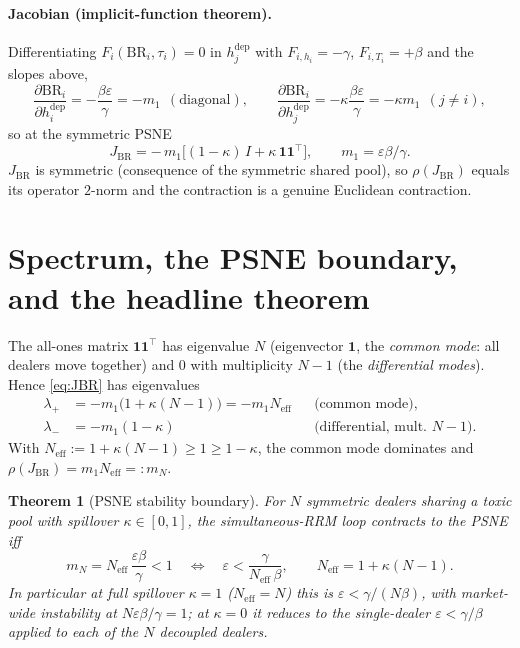 \documentclass[11pt]{article}
\newtheorem{theorem}{Theorem}
\newcommand{\eps}{\varepsilon}
\newcommand{\BR}{\mathrm{BR}}
\newcommand{\Neff}{N_{\mathrm{eff}}}
\newcommand{\ones}{\bm{1}}
\begin{document}
\paragraph{Jacobian (implicit-function theorem).}
Differentiating $F_i(\BR_i,\tau_i)=0$ in $h_j^{\mathrm{dep}}$ with $F_{i,h_i}=-\gamma$,
$F_{i,T_i}=+\beta$ and the slopes above,
%
\begin{equation}
  \frac{\partial \BR_i}{\partial h_i^{\mathrm{dep}}} = -\frac{\beta\eps}{\gamma}=-m_1
  \ \ (\text{diagonal}),\qquad
  \frac{\partial \BR_i}{\partial h_j^{\mathrm{dep}}} = -\kappa\frac{\beta\eps}{\gamma}=-\kappa m_1
  \ \ (j\ne i),
\end{equation}
%
so at the symmetric PSNE
%
\begin{equation}
  J_{\BR} = -\,m_1\big[(1-\kappa)\,I + \kappa\,\ones\ones^{\!\top}\big],
  \qquad m_1=\eps\beta/\gamma.
  \label{eq:JBR}
\end{equation}
%
$J_{\BR}$ is symmetric (consequence of the symmetric shared pool), so $\rho(J_{\BR})$
equals its operator $2$-norm and the contraction is a genuine Euclidean contraction.

\section{Spectrum, the PSNE boundary, and the headline theorem}

The all-ones matrix $\ones\ones^{\!\top}$ has eigenvalue $N$ (eigenvector $\ones$,
the \emph{common mode}: all dealers move together) and $0$ with multiplicity $N-1$
(the \emph{differential modes}). Hence \eqref{eq:JBR} has eigenvalues
%
\begin{align*}
  \lambda_+ &= -m_1\big(1+\kappa(N-1)\big) = -m_1\Neff && \text{(common mode)},\\
  \lambda_- &= -m_1(1-\kappa) && \text{(differential, mult. } N-1).
\end{align*}
%
With $\Neff:=1+\kappa(N-1)\ge 1\ge 1-\kappa$, the common mode dominates and
$\rho(J_{\BR})=m_1\Neff=:m_N$.

\begin{theorem}[PSNE stability boundary]
For $N$ symmetric dealers sharing a toxic pool with spillover $\kappa\in[0,1]$, the
simultaneous-RRM loop contracts to the PSNE iff
%
\[
  m_N = \Neff\,\frac{\eps\beta}{\gamma}<1
  \quad\Longleftrightarrow\quad
  \eps<\frac{\gamma}{\Neff\,\beta},\qquad \Neff=1+\kappa(N-1).
\]
%
In particular at full spillover $\kappa=1$ ($\Neff=N$) this is $\eps<\gamma/(N\beta)$,
with market-wide instability at $N\eps\beta/\gamma=1$; at $\kappa=0$ it reduces to
the single-dealer $\eps<\gamma/\beta$ applied to each of the $N$ decoupled dealers.
\end{theorem}
\end{document}
